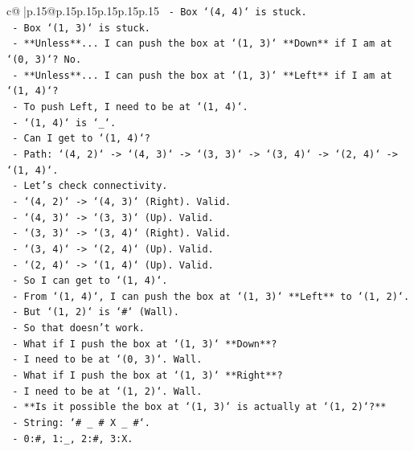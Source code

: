 \documentclass{article}
\begin{document}
{\begin{supertabular}{c@{$\;$}|p{.15\linewidth}@{}p{.15\linewidth}p{.15\linewidth}p{.15\linewidth}p{.15\linewidth}p{.15\linewidth}}
{{{\texttt{          {-} Box `(4, 4)` is stuck.} \\
\texttt{          {-} Box `(1, 3)` is stuck.} \\
\texttt{          {-} **Unless**... I can push the box at `(1, 3)` **Down** if I am at `(0, 3)`? No.} \\
\texttt{          {-} **Unless**... I can push the box at `(1, 3)` **Left** if I am at `(1, 4)`?} \\
\texttt{            {-} To push Left, I need to be at `(1, 4)`.} \\
\texttt{            {-} `(1, 4)` is `\_`.} \\
\texttt{            {-} Can I get to `(1, 4)`?} \\
\texttt{            {-} Path: `(4, 2)` {-}> `(4, 3)` {-}> `(3, 3)` {-}> `(3, 4)` {-}> `(2, 4)` {-}> `(1, 4)`.} \\
\texttt{            {-} Let's check connectivity.} \\
\texttt{            {-} `(4, 2)` {-}> `(4, 3)` (Right). Valid.} \\
\texttt{            {-} `(4, 3)` {-}> `(3, 3)` (Up). Valid.} \\
\texttt{            {-} `(3, 3)` {-}> `(3, 4)` (Right). Valid.} \\
\texttt{            {-} `(3, 4)` {-}> `(2, 4)` (Up). Valid.} \\
\texttt{            {-} `(2, 4)` {-}> `(1, 4)` (Up). Valid.} \\
\texttt{            {-} So I can get to `(1, 4)`.} \\
\texttt{            {-} From `(1, 4)`, I can push the box at `(1, 3)` **Left** to `(1, 2)`.} \\
\texttt{            {-} But `(1, 2)` is `\#` (Wall).} \\
\texttt{            {-} So that doesn't work.} \\
\texttt{          {-} What if I push the box at `(1, 3)` **Down**?} \\
\texttt{            {-} I need to be at `(0, 3)`. Wall.} \\
\texttt{          {-} What if I push the box at `(1, 3)` **Right**?} \\
\texttt{            {-} I need to be at `(1, 2)`. Wall.} \\
\texttt{          {-} **Is it possible the box at `(1, 3)` is actually at `(1, 2)`?**} \\
\texttt{            {-} String: `\# \_ \# X \_ \#`.} \\
\texttt{            {-} 0:\#, 1:\_, 2:\#, 3:X.} \\
}}}
\end{supertabular}}
\end{document}
